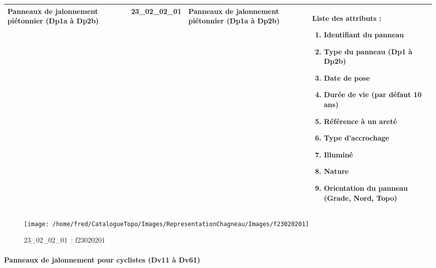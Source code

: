 \documentclass[12pt,titlepage]{book}
\begin{document}
\renewcommand{\arraystretch}{1.2}
\begin{supertabular}{|p{10cm}|c|p{13cm}|p{12cm}|}
 Panneaux de jalonnement piétonnier (Dp1a à Dp2b) & 23\_02\_02\_01 & Panneaux de jalonnement piétonnier (Dp1a à Dp2b) & Liste des attributs :
\begin{enumerate}
  \item Identifiant du panneau  \item Type du panneau (Dp1 à Dp2b)  \item Date de pose  \item Durée de vie (par défaut 10 ans)  \item Référence à un areté  \item Type d'accrochage  \item Illuminé  \item Nature  \item Orientation du panneau (Grade, Nord, Topo)\end{enumerate}
\\
\hline
\end{supertabular}
\begin{figure}[h!]
  \hfill         %
  \begin{minipage}[t]{3cm}
    \begin{center}
      \texttt{[image: /home/fred/CatalogueTopo/Images/RepresentationChagneau/Images/f23020201]}
      \caption[~23\_02\_02\_01]{\small{23\_02\_02\_01~:} \tiny{f23020201}}\label{f23020201}
    \end{center}
  \end{minipage}
\end{figure}


\paragraph{Panneaux de jalonnement pour cyclistes (Dv11 à Dv61)}
\noindent
\vspace{\baselineskip}
\end{document}
